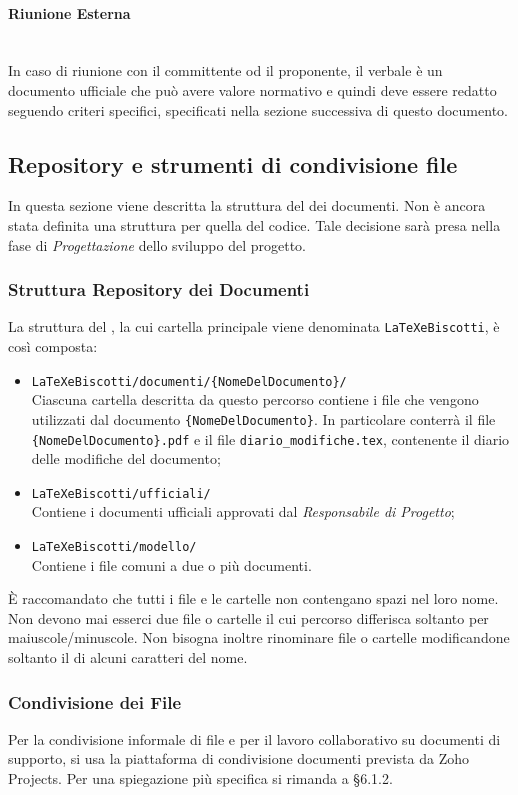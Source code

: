 \paragraph{Riunione Esterna}\mbox{}\\
In caso di riunione con il committente od il proponente, il verbale è un documento ufficiale che può avere valore normativo e quindi deve essere redatto seguendo criteri
specifici, specificati nella sezione successiva di questo documento. 

\subsection{Repository e strumenti di condivisione file}
In questa sezione viene descritta la struttura del  dei documenti. Non è ancora stata definita una struttura per quella del codice. Tale decisione sarà presa nella fase di \textit{Progettazione} dello sviluppo del progetto.
\subsubsection{Struttura Repository dei Documenti}
La struttura del , la cui cartella principale viene denominata \texttt{LaTeXeBiscotti}, è così composta:
\begin{itemize}
\item \texttt{LaTeXeBiscotti/documenti/\{NomeDelDocumento\}/} \\ 
Ciascuna cartella descritta da questo percorso contiene i file che vengono utilizzati dal documento \texttt{\{NomeDelDocumento\}}. In particolare conterrà il file \texttt{\{NomeDelDocumento\}.pdf}
e il file \texttt{diario\_modifiche.tex}, contenente il diario delle modifiche del documento;
\item \texttt{LaTeXeBiscotti/ufficiali/} \\
Contiene i documenti ufficiali approvati dal \textit{Responsabile di Progetto};
\item \texttt{LaTeXeBiscotti/modello/} \\
Contiene i file comuni a due o più documenti.
\end{itemize}
È raccomandato che tutti i file e le cartelle non contengano spazi nel loro nome. Non devono mai esserci due file o cartelle il cui percorso differisca soltanto per maiuscole/minuscole. Non bisogna inoltre rinominare file o cartelle modificandone soltanto il  di alcuni caratteri del nome.

\subsubsection{Condivisione dei File}
Per la condivisione informale di file e per il lavoro collaborativo su documenti di supporto, si usa la piattaforma di condivisione documenti prevista da Zoho Projects. Per una spiegazione più specifica si rimanda a §6.1.2.
